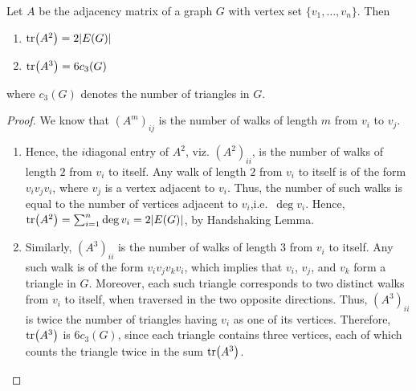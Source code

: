 \begin{Theorem}
Let $A$ be the adjacency matrix of a graph $G$ with vertex set $\{v_1, \ldots, v_n\}$. Then
\begin{enumerate}[label=(\roman*)]
\item $\tr(A^2) = 2 |E(G)|$
\item $\tr(A^3) = 6 c_3(G)$
\end{enumerate}
where $c_3(G)$ denotes the number of triangles in $G$.
\end{Theorem}

\begin{proof}
We know that $(A^m)_{ij}$ is the number of walks of length $m$ from $v_i$ to $v_j$.
\begin{enumerate}[label=(\roman*)]
\item Hence, the $i$\nth diagonal entry of $A^2$, viz. $(A^2)_{ii}$, is the number of walks of length $2$ from $v_i$ to itself. Any walk of length $2$ from $v_i$ to itself is of the form $v_i v_j v_i$, where $v_j$ is a vertex adjacent to $v_i$. Thus, the number of such walks is equal to the number of vertices adjacent to $v_i$,i.e.\ $\deg v_i$. Hence, $\tr(A^2) = \sum_{i=1}^n \deg v_i = 2|E(G)|$, by Handshaking Lemma.

\item Similarly, $(A^3)_{ii}$ is the number of walks of length $3$ from $v_i$ to itself. Any such walk is of the form $v_i v_j v_k v_i$, which implies that $v_i$, $v_j$, and $v_k$ form a triangle in $G$. Moreover, each such triangle corresponds to two distinct walks from $v_i$ to itself, when traversed in the two opposite directions. Thus, $(A^3)_{ii}$ is twice the number of triangles having $v_i$ as one of its vertices. Therefore, $\tr(A^3)$ is $6 c_3(G)$, since each triangle contains three vertices, each of which counts the triangle twice in the sum $\tr(A^3)$. \qedhere
\end{enumerate}
\end{proof}

